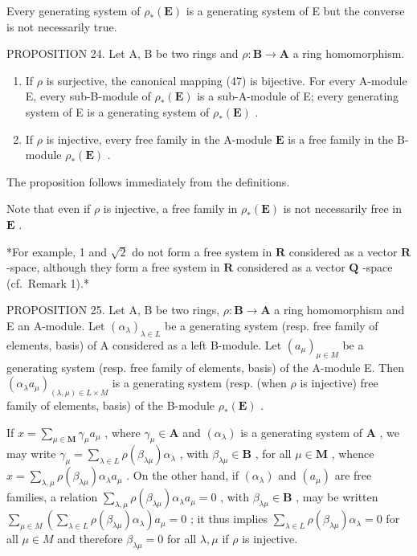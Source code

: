 Every generating system of \(\rho_{*}(\mathbf{E})\) is a generating system of E but the converse is not necessarily true.

PROPOSITION 24. Let A, B be two rings and \(\rho: \mathbf{B} \to \mathbf{A}\) a ring homomorphism.

\begin{enumerate}
\def\labelenumi{(\roman{enumi})}
\item
  If \(\rho\) is surjective, the canonical mapping (47) is bijective. For every A-module E, every sub-B-module of \(\rho_{*}(\mathbf{E})\) is a sub-A-module of E; every generating system of E is a generating system of \(\rho_{*}(\mathbf{E})\) .
\item
  If \(\rho\) is injective, every free family in the A-module \(\mathbf{E}\) is a free family in the B-module \(\rho_{*}(\mathbf{E})\) .
\end{enumerate}

The proposition follows immediately from the definitions.

Note that even if \(\rho\) is injective, a free family in \(\rho_{*}(\mathbf{E})\) is not necessarily free in \(\mathbf{E}\) .

*For example, 1 and \(\sqrt{2}\) do not form a free system in \(\mathbf{R}\) considered as a vector \(\mathbf{R}\) -space, although they form a free system in \(\mathbf{R}\) considered as a vector \(\mathbf{Q}\) -space (cf.~Remark 1).*

PROPOSITION 25. Let A, B be two rings, \(\rho: \mathbf{B} \to \mathbf{A}\) a ring homomorphism and E an A-module. Let \((\alpha_{\lambda})_{\lambda \in L}\) be a generating system (resp. free family of elements, basis) of A considered as a left B-module. Let \((a_{\mu})_{\mu \in M}\) be a generating system (resp. free family of elements, basis) of the A-module E. Then \((\alpha_{\lambda}a_{\mu})_{(\lambda,\mu) \in L \times M}\) is a generating system (resp. (when \(\rho\) is injective) free family of elements, basis) of the B-module \(\rho_{*}(\mathbf{E})\) .

If \(x = \sum_{\mu \in \mathbf{M}} \gamma_{\mu} a_{\mu}\) , where \(\gamma_{\mu} \in \mathbf{A}\) and \((\alpha_{\lambda})\) is a generating system of \(\mathbf{A}\) , we may write \(\gamma_{\mu} = \sum_{\lambda \in L} \rho(\beta_{\lambda \mu}) \alpha_{\lambda}\) , with \(\beta_{\lambda \mu} \in \mathbf{B}\) , for all \(\mu \in \mathbf{M}\) , whence \(x = \sum_{\lambda, \mu} \rho(\beta_{\lambda \mu}) \alpha_{\lambda} a_{\mu}\) . On the other hand, if \((\alpha_{\lambda})\) and \((a_{\mu})\) are free families, a relation \(\sum_{\lambda, \mu} \rho(\beta_{\lambda \mu}) \alpha_{\lambda} a_{\mu} = 0\) , with \(\beta_{\lambda \mu} \in \mathbf{B}\) , may be written \(\sum_{\mu \in M} \left( \sum_{\lambda \in L} \rho(\beta_{\lambda \mu}) \alpha_{\lambda} \right) a_{\mu} = 0\) ; it thus implies \(\sum_{\lambda \in L} \rho(\beta_{\lambda \mu}) \alpha_{\lambda} = 0\) for all \(\mu \in M\) and therefore \(\beta_{\lambda \mu} = 0\) for all \(\lambda, \mu\) if \(\rho\) is injective.

